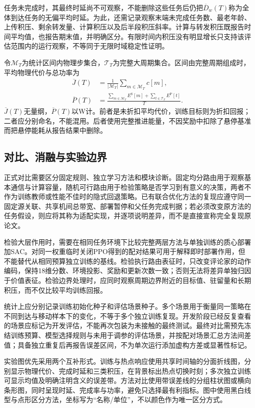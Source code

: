 任务未完成时，其最终时延尚不可观察，不能删除这些任务后仍把$\overline D_w(T)$称为全体到达任务的无偏平均时延。为此，还需记录观察末端未完成任务数、最老年龄、上传积压、剩余转发量、计算积压以及后半段积压斜率。计算与转发积压既报告时间平均值，也报告期末值，并明确区分。有限时间内积压没有明显增长只支持该评估范围内的运行观察，不等同于无限时域稳定性证明。

令$\mathcal M_T$为统计区间内物理步集合，$\mathcal T_T$为完整大周期集合。区间由完整周期组成时，平均物理代价与总功率为
\[
\begin{aligned}
 \overline J(T)&=\frac{1}{|\mathcal M_T|}
 \sum_{m\in\mathcal M_T}c[m],\\
 \overline P(T)&=\frac{\sum_{m\in\mathcal M_T}E^{\mathrm S}[m]
 +\sum_{t\in\mathcal T_T}E^{\mathrm P}[t]}{T}.
 \end{aligned}\tag{55}
\]
$\overline J(T)$无量纲，$\overline P(T)$以W计。前者是未折扣平均代价，训练目标则为折扣回报；二者应分别命名，不能混用。后者使用完整推进能量，不因奖励中扣除了悬停基准而把悬停能耗从报告结果中删除。

\subsection{对比、消融与实验边界}
正式对比需要区分固定规则、独立学习方法和模块诊断。固定均分路由用于观察基本通信与计算容量，随机可行路由用于检验策略是否学习到有意义的决策，两者不作为训练教师或性能不佳时的隐式回退策略。已有联合优化方法的复现应遵守同一固定源关联、共享机间总带宽、部署暂停和父任务完成判据；若必须改变原方法的任务假设，则应将其称为适配实现，并逐项说明差异，而不是直接宣称完全复现原论文。

检验大层作用时，需要在相同任务环境下比较完整两层方法与单独训练的质心部署加SAC。对同一权重临时关闭PPO得到的配对结果可用于解释即时部署作用，但不能替代从相同预算独立训练的基线。检验执行路由表征时，只改变评论家的动作编码，保持18维分数、环境投影、奖励和更新次数一致；否则无法将差异单独归因于价值表征。检验边界处理时，应同时观察周期边界附近的目标值、驻留量和长期积压，而不仅比较平均训练回报。

统计上应分别记录训练初始化种子和评估场景种子。多个场景用于衡量同一策略在不同到达与移动样本下的变化，不等于多个独立训练复现。开发阶段已经反复查看的场景应标记为开发评估，不能再次包装为未接触的最终测试。最终对比需预先冻结训练预算、模型选择规则与未用于调参的评估场景，并按配对场景汇总方法间差值；具备独立重复后再报告误差区间，不为单次运行添加虚构方差或显著性标记。

实验图优先采用两个互补形式。训练与热点响应使用共享时间轴的分面折线图，分别显示物理代价、完成时延和三类积压，在背景标出热点切换时刻；多次独立训练可显示均值及明确注明含义的误差带。方法对比使用带误差线的分组柱状图或横向条形图，同时呈现时延、完成率与功率，避免只选择最有利指标。图中使用黑白线型与点形区分方法，坐标写为“名称/单位”，不以颜色作为唯一区分方式。

